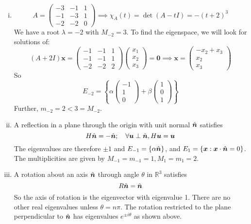 \documentclass{article}
\begin{document}
\begin{enumerate}[(i)]
	\item
	      \[ A = \begin{pmatrix}
			      -3 & -1 & 1 \\ -1 & -3 & 1 \\ -2 & -2 & 0
		      \end{pmatrix} \implies \chi_A(t) = \det(A - tI) = -(t + 2)^3 \]
	      We have a root $\lambda = -2$ with $M_{-2} = 3$. To find the eigenspace, we will look for solutions of:
	      \[ (A + 2I)\bm x = \begin{pmatrix}
			      -1 & -1 & 1 \\ -1 & -1 & 1 \\ -2 & -2 & 2
		      \end{pmatrix} \begin{pmatrix}
			      x_1 \\ x_2 \\ x_3
		      \end{pmatrix} = \bm 0 \implies \bm x = \begin{pmatrix}
			      -x_2 + x_3 \\ x_2 \\ x_3
		      \end{pmatrix} \]
	      So
	      \[ E_{-2} = \left\{ \alpha\begin{pmatrix}
			      -1 \\ 1 \\ 0
		      \end{pmatrix} + \beta\begin{pmatrix}
			      1 \\ 0 \\ 1
		      \end{pmatrix} \right\} \]
	      Further, $m_{-2} = 2 < 3 = M_{-2}$.

	\item A reflection in a plane through the origin with unit normal $\hat{\bm n}$ satisfies
	      \[ H\hat{\bm n} = -\hat{\bm n};\quad \forall \bm u \perp \hat{\bm n}, H \bm u = \bm u \]
	      The eigenvalues are therefore $\pm 1$ and $E_{-1} = \{ \alpha \hat{\bm n} \}$, and $E_1 = \{ \bm x: \bm x \cdot \hat{\bm n} = 0 \}$. The multiplicities are given by $M_{-1} = m_{-1} = 1, M_1 = m_1 = 2$.

	\item A rotation about an axis $\hat{\bm n}$ through angle $\theta$ in $\mathbb R^3$ satisfies
	      \[ R\hat{\bm n} = \hat{\bm n} \]
	      So the axis of rotation is the eigenvector with eigenvalue 1. There are no other real eigenvalues unless $\theta = n\pi$. The rotation restricted to the plane perpendicular to $\hat{\bm n}$ has eigenvalues $e^{\pm i \theta}$ as shown above.
\end{enumerate}
\end{document}
